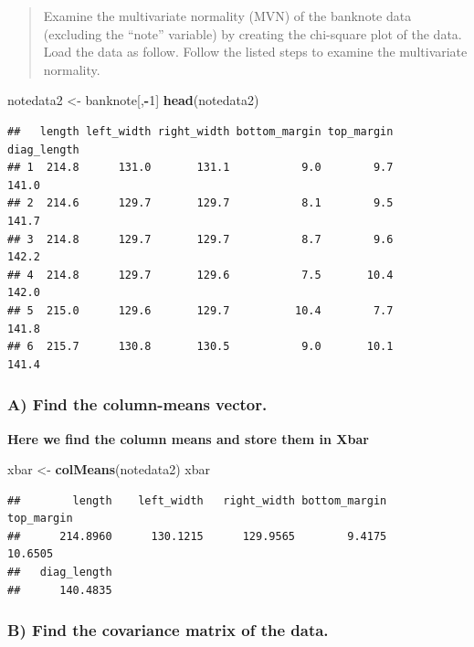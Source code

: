 \documentclass[
]{article}
\newenvironment{Shaded}{\begin{snugshade}}{\end{snugshade}}
\newcommand{\DecValTok}[1]{\textcolor[rgb]{0.00,0.00,0.81}{#1}}
\newcommand{\KeywordTok}[1]{\textcolor[rgb]{0.13,0.29,0.53}{\textbf{#1}}}
\newcommand{\NormalTok}[1]{#1}
\newcommand{\OperatorTok}[1]{\textcolor[rgb]{0.81,0.36,0.00}{\textbf{#1}}}
\newcommand{\StringTok}[1]{\textcolor[rgb]{0.31,0.60,0.02}{#1}}
\begin{document}
\begin{quote}
Examine the multivariate normality (MVN) of the banknote data (excluding
the ``note'' variable) by creating the chi-square plot of the data. Load
the data as follow. Follow the listed steps to examine the multivariate
normality.
\end{quote}

\begin{Shaded}
\begin{Highlighting}[]
\NormalTok{notedata2 <-}\StringTok{ }\NormalTok{banknote[,}\OperatorTok{-}\DecValTok{1}\NormalTok{]}
\KeywordTok{head}\NormalTok{(notedata2)}
\end{Highlighting}
\end{Shaded}

\begin{verbatim}
##   length left_width right_width bottom_margin top_margin diag_length
## 1  214.8      131.0       131.1           9.0        9.7       141.0
## 2  214.6      129.7       129.7           8.1        9.5       141.7
## 3  214.8      129.7       129.7           8.7        9.6       142.2
## 4  214.8      129.7       129.6           7.5       10.4       142.0
## 5  215.0      129.6       129.7          10.4        7.7       141.8
## 6  215.7      130.8       130.5           9.0       10.1       141.4
\end{verbatim}

\hypertarget{a-find-the-column-means-vector.}{%
\subsubsection{A) Find the column-means
vector.}\label{a-find-the-column-means-vector.}}

\textbf{Here we find the column means and store them in Xbar}

\begin{Shaded}
\begin{Highlighting}[]
\NormalTok{xbar <-}\StringTok{ }\KeywordTok{colMeans}\NormalTok{(notedata2)}
\NormalTok{xbar}
\end{Highlighting}
\end{Shaded}

\begin{verbatim}
##        length    left_width   right_width bottom_margin    top_margin 
##      214.8960      130.1215      129.9565        9.4175       10.6505 
##   diag_length 
##      140.4835
\end{verbatim}

\hypertarget{b-find-the-covariance-matrix-of-the-data.}{%
\subsubsection{B) Find the covariance matrix of the
data.}\label{b-find-the-covariance-matrix-of-the-data.}}
\end{document}
